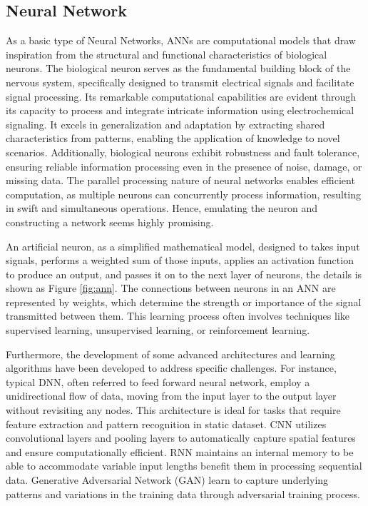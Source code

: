 \subsection{Neural Network}
As a basic type of Neural Networks, \ac{ANN}s are computational models that draw inspiration from the structural and functional characteristics of biological neurons\cite{zhangIntroductionArtificialNeural2000}. The biological neuron serves as the fundamental building block of the nervous system, specifically designed to transmit electrical signals and facilitate signal processing. Its remarkable computational capabilities are evident through its capacity to process and integrate intricate information using electrochemical signaling\cite{zouOverviewArtificialNeural2009}. It excels in generalization and adaptation by extracting shared characteristics from patterns, enabling the application of knowledge to novel scenarios. Additionally, biological neurons exhibit robustness and fault tolerance\cite{chenElectrochemicalMemristorBasedArtificialNeurons}, ensuring reliable information processing even in the presence of noise, damage, or missing data. The parallel processing nature of neural networks enables efficient computation\cite{hopfieldNeuralNetworksPhysical1982}, as multiple neurons can concurrently process information, resulting in swift and simultaneous operations. Hence, emulating the neuron and constructing a network seems highly promising. 

An artificial neuron, as a simplified mathematical model, designed to takes input signals, performs a weighted sum of those inputs, applies an activation function to produce an output, and passes it on to the next layer of neurons, the details is shown as Figure \ref{fig:ann}. The connections between neurons in an ANN are represented by weights, which determine the strength or importance of the signal transmitted between them. This learning process often involves techniques like supervised learning\cite{ebertRobustnessRetryingClosedLoop2018}, unsupervised learning\cite{koenigUnsupervisedLearningProbabilistic1996}, or reinforcement learning\cite{jiSynthesizingOptimalGait2022}. 


Furthermore, the development of some advanced architectures and learning algorithms have been developed to address specific challenges. For instance, typical \ac{DNN}, often referred to feed forward neural network, employ a unidirectional flow of data, moving from the input layer to the output layer without revisiting any nodes. This architecture is ideal for tasks that require feature extraction and pattern recognition in static dataset\cite{hwangboLearningAgileDynamic2019}. \ac{CNN} utilizes convolutional layers and pooling layers to automatically capture spatial features and ensure computationally efficient\cite{albawiUnderstandingConvolutionalNeural2017}. \ac{RNN} maintains an internal memory to be able to accommodate variable input lengths benefit them in processing sequential data\cite{liptonCriticalReviewRecurrent2015}. Generative Adversarial Network (GAN) learn to capture underlying patterns and variations in the training data through adversarial training process\cite{songEnergyConsumptionAuditing2023}.   

